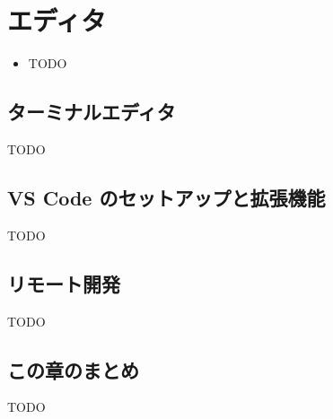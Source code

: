 \chapter{エディタ}
\label{chap:editor}

\begin{goalbox}
  \begin{itemize}
    \item TODO
  \end{itemize}
\end{goalbox}

\section{ターミナルエディタ}

TODO

\section{VS Code のセットアップと拡張機能}

TODO

\section{リモート開発}

TODO

\section*{この章のまとめ}

TODO
